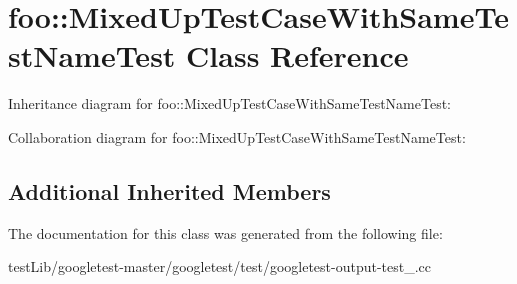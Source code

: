 \hypertarget{classfoo_1_1MixedUpTestCaseWithSameTestNameTest}{}\section{foo\+:\+:Mixed\+Up\+Test\+Case\+With\+Same\+Test\+Name\+Test Class Reference}
\label{classfoo_1_1MixedUpTestCaseWithSameTestNameTest}


Inheritance diagram for foo\+:\+:Mixed\+Up\+Test\+Case\+With\+Same\+Test\+Name\+Test\+:


Collaboration diagram for foo\+:\+:Mixed\+Up\+Test\+Case\+With\+Same\+Test\+Name\+Test\+:
\subsection*{Additional Inherited Members}


The documentation for this class was generated from the following file\+:\begin{DoxyCompactItemize}
\item 
test\+Lib/googletest-\/master/googletest/test/googletest-\/output-\/test\+\_\+.\+cc\end{DoxyCompactItemize}
